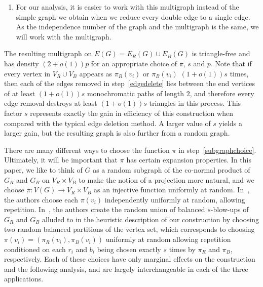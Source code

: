 \documentclass{article}
\begin{document}
\begin{enumerate}
\begin{enumerate}
        $v_jv_\ell\in \tilde{E}_R(G)$.
        \item From every blue  triangle $v_iv_jv_\ell\subseteq\tilde{E}_B(G)$ with $\pi_B(v_j)\pi_B(v_\ell)$ later in the order of the pairs in $V_B$ than $\pi_B(v_i)\pi_B(v_j)$ and $\pi_B(v_i)\pi_B(v_\ell)$, remove %
        $v_jv_\ell\in \tilde{E}_B(G)$.
        \item From every triangle $v_iv_jv_\ell$ with red edges $v_iv_j,v_iv_\ell\in\tilde{E}_R(G)$, and blue edge $v_jv_\ell\in\tilde{E}_B(G)$, remove 
        $v_jv_\ell\in\tilde{E}_B(G)$.
        \item From every triangle $v_iv_jv_\ell$ with blue edges $v_iv_j,v_iv_\ell\in\tilde{E}_B(G)$, and red edge $v_jv_\ell\in\tilde{E}_R(G)$, remove 
        $v_jv_\ell\in\tilde{E}_R(G)$.
    \end{enumerate}
    \item For our analysis, it is easier to work with this multigraph instead of the simple graph we obtain when we reduce every double edge to a single edge. As the independence number of the graph and the multigraph is the same, we will work with the multigraph.
\end{enumerate}

The resulting multigraph on $E(G)=E_R(G)\cup E_B(G)$ is triangle-free and has density $(2+o(1))p$ for an appropriate choice of $\pi$, $s$ and $p$. Note that if every vertex in $V_R\cup V_B$ appears as $\pi_R(v_i)$ or $\pi_B(v_i)$  $(1+o(1))s$ times, then each of the edges removed in step~\ref{edgedelete} lies between the end vertices of at least $(1+o(1))s$ monochromatic paths of length $2$, and therefore every edge removal destroys at least $(1+o(1))s$ triangles in this process. This factor $s$ represents exactly the gain in efficiency of this construction when compared with the typical edge deletion method. A larger value of $s$ yields a larger gain, but the resulting graph is also further from a random graph.

There are many different ways to choose the function $\pi$ in step~\ref{subgraphchoice}. Ultimately, it will be important that $\pi$ has certain expansion properties.
In this paper, we like to think of $G$ as a random subgraph of the co-normal product of $G_R$ and $G_B$ on $V_R\times V_B$ to make the notion of a projection more natural, and we choose $\pi:V(G)\to V_R\times V_B$ as an injective function uniformly at random. In~\cite{kühn2025disproofoddhadwigerconjecture}, the authors choose each $\pi(v_i)$ independently uniformly at random, allowing repetition. In~\cite{campos2025polynomialimprovementoddcyclecomplete}, the authors create the random union of balanced $s$-blow-ups of $G_R$ and $G_B$ alluded to in the heuristic description of our construction by choosing two random balanced partitions of the vertex set, which corresponds to choosing $\pi(v_i)=(\pi_R(v_i),\pi_B(v_i))$ uniformly at random allowing repetition conditioned on each $r_i$ and $b_i$ being chosen exactly $s$ times by $\pi_R$ and $\pi_B$, respectively. Each of these choices have only marginal effects on the construction and the following analysis, and are largely interchangeable in each of the three applications.
\end{document}
